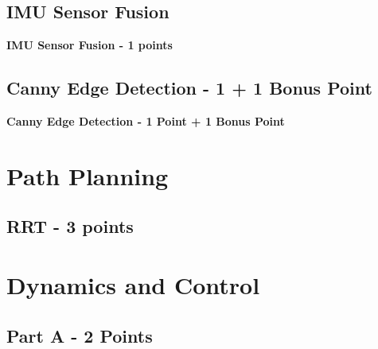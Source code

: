 \documentclass{article}
\numberwithin{equation}{section} %
\numberwithin{figure}{section} %
\numberwithin{table}{section} %
\begin{document}
\begin{framed}
\subsection{IMU Sensor Fusion}
\label{sec:SensorFusion}
\textbf{IMU Sensor Fusion - 1 points} \\
\end{framed}


\begin{framed}
\subsection{Canny Edge Detection - 1 + 1 Bonus Point}
\label{sec:CannyEdge}
\textbf{ Canny Edge Detection - 1 Point + 1 Bonus Point} \\
\end{framed}

\newpage

\section{Path Planning}

\begin{framed}
\subsection{ RRT - 3 points}
\label{sec:RRT}
\end{framed}

\section{Dynamics and Control}

\begin{framed}
\subsection{ Part A - 2 Points}
\label{sec:DynAndCtrl}
\end{framed}
\end{document}
